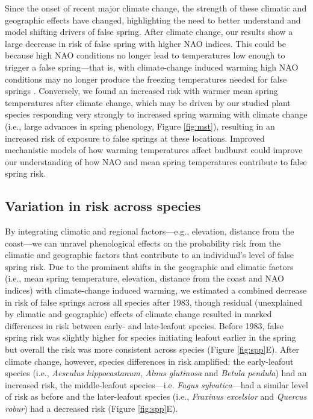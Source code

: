 \documentclass{article}\usepackage[]{graphicx}\usepackage[]{color}
\begin{document}
Since the onset of recent major climate change, the strength of these climatic and geographic effects have changed, highlighting the need to better understand and model shifting drivers of false spring. After climate change, our results show a large decrease in risk of false spring with higher NAO indices. This could be because high NAO conditions no longer lead to temperatures low enough to trigger a false spring---that is, with climate-change induced warming high NAO conditions may no longer produce the freezing temperatures needed for false springs \citep{Screen2017}. Conversely, we found an increased risk with warmer mean spring temperatures after climate change, which may be driven by our studied plant species responding very strongly to increased spring warming with climate change (i.e., large advances in spring phenology, Figure \ref{fig:mst}), resulting in an increased risk of exposure to false springs at these locations. Improved mechanistic models of how warming temperatures affect budburst \citep{Gauzere2017,Chuine2016} could improve our understanding of how NAO and mean spring temperatures contribute to false spring risk.  

\subsection*{Variation in risk across species} 
By integrating climatic and regional factors---e.g., elevation, distance from the coast---we can unravel phenological effects on the probability risk from the climatic and geographic factors that contribute to an individual's level of false spring risk. Due to the prominent shifts in the geographic and climatic factors (i.e., mean spring temperature, elevation, distance from the coast and NAO indices) with climate-change induced warming, we estimated a combined decrease in risk of false springs across all species after 1983, though residual (unexplained by climatic and geographic) effects of climate change resulted in marked differences in risk between early- and late-leafout species. Before 1983, false spring risk was slightly higher for species initiating leafout earlier in the spring but overall the risk was more consistent across species (Figure \ref{fig:spp}E). After climate change, however, species differences in risk amplified: the early-leafout species (i.e., \textit{Aesculus hippocastanum}, \textit{Alnus glutinosa} and \textit{Betula pendula}) had an increased risk, the middle-leafout species---i.e. \textit{Fagus sylvatica}---had a similar level of risk as before and the later-leafout species (i.e., \textit{Fraxinus excelsior} and \textit{Quercus robur}) had a decreased risk (Figure \ref{fig:spp}E). 
\end{document}
